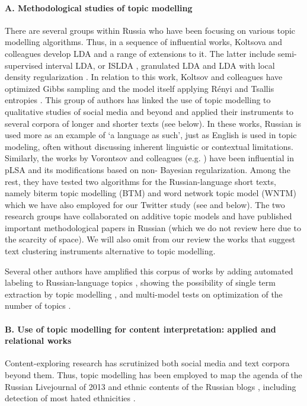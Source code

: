 \paragraph{A. Methodological studies of topic modelling} 
There are several groups within Russia who have been focusing on various topic modelling algorithms. Thus, in a sequence of influential works, Koltsova and colleagues develop LDA \cite{KoltcovKoltsovaNikolenko2014} and a range of extensions to it. The latter include semi-supervised interval LDA, or ISLDA \cite{BodrunovaKoltcovKoltsova}, granulated LDA \cite{KoltcovNikolenkoKoltsova0516} and LDA with local density regularization \cite{KoltcovNikolenkoKoltsova0916}. In relation to this work, Koltsov and colleagues have optimized Gibbs sampling \cite{KoltcovNikolenkoKoltsova16} and the model itself applying Rényi and Tsallis entropies \cite{Koltcov}. This group of authors has linked the use of topic modelling to qualitative studies of social media and beyond \cite{NikolenkoKoltcovKoltsova} and applied their instruments to several corpora of longer and shorter texts (see below). In these works, Russian is used more as an example of ‘a language as such’, just as English is used in topic modeling, often without discussing inherent linguistic or contextual limitations. Similarly, the works by Vorontsov and colleagues (e.g. \cite{VorontsovFreiApishev1015,VorontsovPotapenko,VorontsovFreiApishev0415}) have been influential in pLSA and its modifications based on non- Bayesian regularization. Among the rest, they have tested two algorithms for the Russian-language short texts, namely biterm topic modelling (BTM) and word network topic model (WNTM) \cite[p.~191]{KochedykovApishevGolitsyn} which we have also employed for our Twitter study (see \cite{BlekanovTarasovMaksimov} and below). The two research groups have collaborated on additive topic models \cite{ApishevKoltcovKoltsova1016,ApishevKoltcovKoltsova16} and have published important methodological papers in Russian (which we do not review here due to the scarcity of space). We will also omit from our review the works that suggest text clustering instruments alternative to topic modelling.

Several other authors have amplified this corpus of works by adding automated labeling to Russian-language topics \cite{MirzagitovaMitrofanova}, showing the possibility of single term extraction by topic modelling \cite{BolshakovaLoukachevitchNokel}, and multi-model tests on optimization of the number of topics \cite{KrasnovSen}.

\paragraph{B. Use of topic modelling for content interpretation: applied and relational works}
Content-exploring research has scrutinized both social media and text corpora beyond them. Thus, topic modelling has been employed to map the agenda of the Russian Livejournal of 2013 \cite{KoltsovaKoltcov} and ethnic contents of the Russian blogs \cite{Nagornyy}, including detection of most hated ethnicities \cite{BodrunovaKoltsovaKoltcov}.

